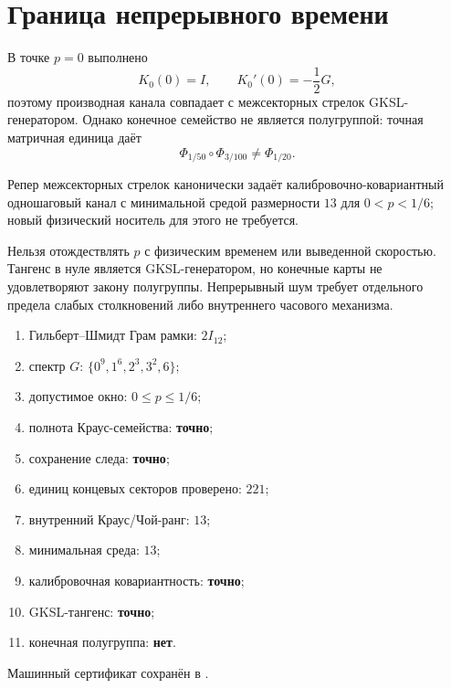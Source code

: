\section{Граница непрерывного времени}

В точке $p=0$ выполнено
\begin{equation}
 K_0(0)=I,\qquad K_0'(0)=-\frac12G,
\end{equation}
поэтому производная канала совпадает с межсекторных стрелок GKSL-генератором.
Однако конечное семейство не является полугруппой: точная матричная единица
даёт
\begin{equation}
 \Phi_{1/50}\!\circ\Phi_{3/100}\ne\Phi_{1/20}.
\end{equation}

\begin{theorem}
Репер межсекторных стрелок канонически задаёт калибровочно-ковариантный одношаговый
канал с минимальной средой размерности $13$ для $0<p<1/6$; новый физический
носитель для этого не требуется.
\end{theorem}

\begin{nogocriterion}
Нельзя отождествлять $p$ с физическим временем или выведенной скоростью.
Тангенс в нуле является GKSL-генератором, но конечные карты не удовлетворяют
закону полугруппы. Непрерывный шум требует отдельного предела слабых столкновений либо
внутреннего часового механизма.
\end{nogocriterion}

\begin{protocol}
\begin{enumerate}
 \item Гильберт--Шмидт Грам рамки: \textbf{$2I_{12}$};
 \item спектр $G$: \textbf{$\{0^9,1^6,2^3,3^2,6\}$};
 \item допустимое окно: \textbf{$0\le p\le1/6$};
 \item полнота Краус-семейства: \textbf{точно};
 \item сохранение следа: \textbf{точно};
 \item единиц концевых секторов проверено: \textbf{$221$};
 \item внутренний Краус/Чой-ранг: \textbf{$13$};
 \item минимальная среда: \textbf{$13$};
 \item калибровочная ковариантность: \textbf{точно};
 \item GKSL-тангенс: \textbf{точно};
 \item конечная полугруппа: \textbf{нет}.
\end{enumerate}
\end{protocol}

Машинный сертификат сохранён в
.